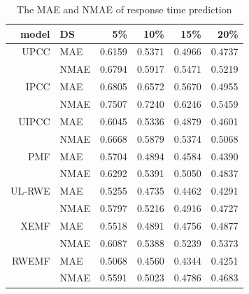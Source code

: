 \documentclass[conference]{IEEEtran}
\begin{document}
\begin{table}[H]
  \centering
  \caption{The MAE and NMAE of response time prediction}
  \label{tb_rt}
    \begin{tabular}{r||l|rrrr}
\hline
model & DS   & 5\%  & 10\% & 15\% & 20\% \\
\hline
UPCC & MAE  & 0.6159 & 0.5371 & 0.4966 & 0.4737 \\
         & NMAE & 0.6794 & 0.5917 & 0.5471 & 0.5219 \\
\hline
IPCC & MAE  & 0.6805 & 0.6572 & 0.5670 & 0.4955 \\
         & NMAE & 0.7507 & 0.7240 & 0.6246 & 0.5459 \\
\hline
UIPCC & MAE  & 0.6045 & 0.5336 & 0.4879 & 0.4601 \\
         & NMAE & 0.6668 & 0.5879 & 0.5374 & 0.5068 \\
\hline
PMF & MAE  & 0.5704 & 0.4894 & 0.4584 & 0.4390 \\
         & NMAE & 0.6292 & 0.5391 & 0.5050 & 0.4837 \\
\hline
UL-RWE & MAE  & 0.5255 & 0.4735 & 0.4462 & 0.4291 \\
         & NMAE & 0.5797 & 0.5216 & 0.4916 & 0.4727 \\
\hline
XEMF & MAE  & 0.5518 & 0.4891 & 0.4756 & 0.4877 \\
         & NMAE & 0.6087 & 0.5388 & 0.5239 & 0.5373 \\
\hline
RWEMF & MAE  & 0.5068 & 0.4560 & 0.4344 & 0.4251 \\
         & NMAE & 0.5591 & 0.5023 & 0.4786 & 0.4683 \\
\hline
    \end{tabular}
\end{table}
\end{document}

